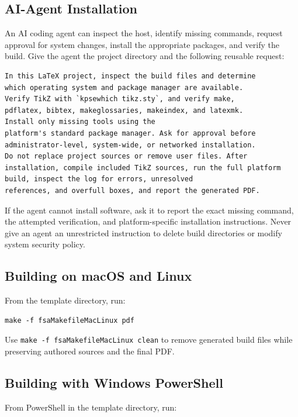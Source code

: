 \subsection{AI-Agent Installation}
\label{Section:AIAgentInstallation}

An AI coding agent can inspect the host, identify missing commands, request
approval for system changes, install the appropriate packages, and verify the
build. Give the agent the project directory and the following reusable request:

\begin{verbatim}
In this LaTeX project, inspect the build files and determine
which operating system and package manager are available.
Verify TikZ with `kpsewhich tikz.sty`, and verify make,
pdflatex, bibtex, makeglossaries, makeindex, and latexmk.
Install only missing tools using the
platform's standard package manager. Ask for approval before
administrator-level, system-wide, or networked installation.
Do not replace project sources or remove user files. After
installation, compile included TikZ sources, run the full platform
build, inspect the log for errors, unresolved
references, and overfull boxes, and report the generated PDF.
\end{verbatim}

If the agent cannot install software, ask it to report the exact missing
command, the attempted verification, and platform-specific installation
instructions. Never give an agent an unrestricted instruction to delete build
directories or modify system security policy.

\subsection{Building on macOS and Linux}

From the template directory, run:

\begin{verbatim}
make -f fsaMakefileMacLinux pdf
\end{verbatim}

Use \texttt{make -f fsaMakefileMacLinux clean} to remove generated build files while preserving authored sources and the final PDF.

\subsection{Building with Windows PowerShell}

From PowerShell in the template directory, run:

